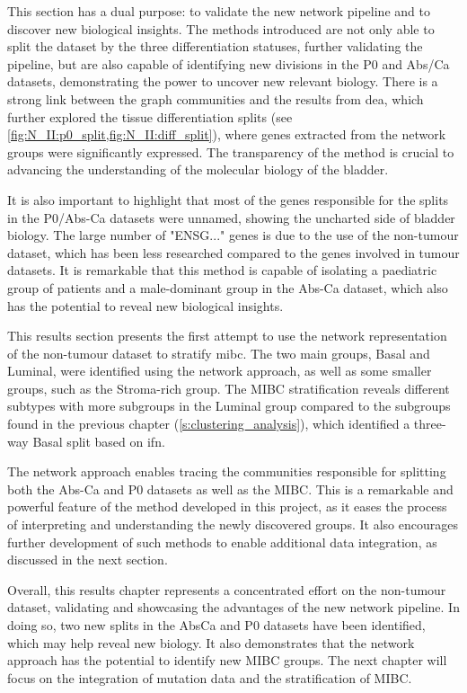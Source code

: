 This section has a dual purpose: to validate the new network pipeline and to discover new biological insights. The methods introduced are not only able to split the dataset by the three differentiation statuses, further validating the pipeline, but are also capable of identifying new divisions in the P0 and Abs/Ca datasets, demonstrating the power to uncover new relevant biology. There is a strong link between the graph communities and the results from \acrfull{dea}, which further explored the tissue differentiation splits (see \cref{fig:N_II:p0_split,fig:N_II:diff_split}), where genes extracted from the network groups were significantly expressed. The transparency of the method is crucial to advancing the understanding of the molecular biology of the bladder.


It is also important to highlight that most of the genes responsible for the splits in the P0/Abs-Ca datasets were unnamed, showing the uncharted side of bladder biology. The large number of "ENSG..." genes is due to the use of the non-tumour dataset, which has been less researched compared to the genes involved in tumour datasets. It is remarkable that this method is capable of isolating a paediatric group of patients and a male-dominant group in the Abs-Ca dataset, which also has the potential to reveal new biological insights.

This results section presents the first attempt to use the network representation of the non-tumour dataset to stratify \acrfull{mibc}. The two main groups, Basal and Luminal, were identified using the network approach, as well as some smaller groups, such as the Stroma-rich group. The MIBC stratification reveals different subtypes with more subgroups in the Luminal group compared to the subgroups found in the previous chapter (\cref{s:clustering_analysis}), which identified a three-way Basal split based on \acrfull{ifn}.

The network approach enables tracing the communities responsible for splitting both the Abs-Ca and P0 datasets as well as the MIBC. This is a remarkable and powerful feature of the method developed in this project, as it eases the process of interpreting and understanding the newly discovered groups. It also encourages further development of such methods to enable additional data integration, as discussed in the next section.

Overall, this results chapter represents a concentrated effort on the non-tumour dataset, validating and showcasing the advantages of the new network pipeline. In doing so, two new splits in the AbsCa and P0 datasets have been identified, which may help reveal new biology. It also demonstrates that the network approach has the potential to identify new MIBC groups. The next chapter will focus on the integration of mutation data and the stratification of MIBC.

